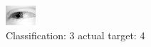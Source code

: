 \begin{figure}[h!]
\begin{center}
\includegraphics[width=0.60\columnwidth]{figures/ID2514_class_3_target_4.png}
\end{center}
\caption{ Classification: 3 actual target: 4}
\label{fig:ID2514_class_3_target_4}
\end{figure}
